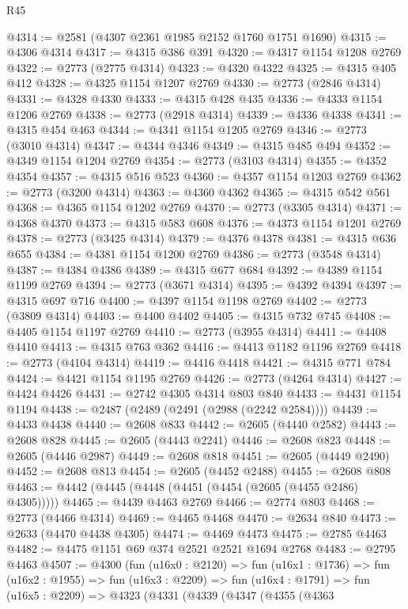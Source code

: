 \begin{lexlean}{R45}
\begin{coremodule}
@4314 := @2581 (@4307 @2361 @1985 @2152 @1760 @1751 @1690)
@4315 := @4306 @4314
@4317 := @4315 @386 @391
@4320 := @4317 @1154 @1208 @2769
@4322 := @2773 (@2775 @4314)
@4323 := @4320 @4322
@4325 := @4315 @405 @412
@4328 := @4325 @1154 @1207 @2769
@4330 := @2773 (@2846 @4314)
@4331 := @4328 @4330
@4333 := @4315 @428 @435
@4336 := @4333 @1154 @1206 @2769
@4338 := @2773 (@2918 @4314)
@4339 := @4336 @4338
@4341 := @4315 @454 @463
@4344 := @4341 @1154 @1205 @2769
@4346 := @2773 (@3010 @4314)
@4347 := @4344 @4346
@4349 := @4315 @485 @494
@4352 := @4349 @1154 @1204 @2769
@4354 := @2773 (@3103 @4314)
@4355 := @4352 @4354
@4357 := @4315 @516 @523
@4360 := @4357 @1154 @1203 @2769
@4362 := @2773 (@3200 @4314)
@4363 := @4360 @4362
@4365 := @4315 @542 @561
@4368 := @4365 @1154 @1202 @2769
@4370 := @2773 (@3305 @4314)
@4371 := @4368 @4370
@4373 := @4315 @583 @608
@4376 := @4373 @1154 @1201 @2769
@4378 := @2773 (@3425 @4314)
@4379 := @4376 @4378
@4381 := @4315 @636 @655
@4384 := @4381 @1154 @1200 @2769
@4386 := @2773 (@3548 @4314)
@4387 := @4384 @4386
@4389 := @4315 @677 @684
@4392 := @4389 @1154 @1199 @2769
@4394 := @2773 (@3671 @4314)
@4395 := @4392 @4394
@4397 := @4315 @697 @716
@4400 := @4397 @1154 @1198 @2769
@4402 := @2773 (@3809 @4314)
@4403 := @4400 @4402
@4405 := @4315 @732 @745
@4408 := @4405 @1154 @1197 @2769
@4410 := @2773 (@3955 @4314)
@4411 := @4408 @4410
@4413 := @4315 @763 @362
@4416 := @4413 @1182 @1196 @2769
@4418 := @2773 (@4104 @4314)
@4419 := @4416 @4418
@4421 := @4315 @771 @784
@4424 := @4421 @1154 @1195 @2769
@4426 := @2773 (@4264 @4314)
@4427 := @4424 @4426
@4431 := @2742 @4305 @4314 @803 @840
@4433 := @4431 @1154 @1194
@4438 := @2487 (@2489 (@2491 (@2988 (@2242 @2584))))
@4439 := @4433 @4438
@4440 := @2608 @833
@4442 := @2605 (@4440 @2582)
@4443 := @2608 @828
@4445 := @2605 (@4443 @2241)
@4446 := @2608 @823
@4448 := @2605 (@4446 @2987)
@4449 := @2608 @818
@4451 := @2605 (@4449 @2490)
@4452 := @2608 @813
@4454 := @2605 (@4452 @2488)
@4455 := @2608 @808
@4463 := @4442 (@4445 (@4448 (@4451 (@4454 (@2605 (@4455 @2486) @4305)))))
@4465 := @4439 @4463 @2769
@4466 := @2774 @803
@4468 := @2773 (@4466 @4314)
@4469 := @4465 @4468
@4470 := @2634 @840
@4473 := @2633 (@4470 @4438 @4305)
@4474 := @4469 @4473
@4475 := @2785 @4463
@4482 := @4475 @1151 @69 @374 @2521 @2521 @1694 @2768
@4483 := @2795 @4463
@4507 := @4300
    (fun (u16x0 : @2120) =>
    fun (u16x1 : @1736) =>
    fun (u16x2 : @1955) =>
    fun (u16x3 : @2209) =>
    fun (u16x4 : @1791) =>
    fun (u16x5 : @2209) =>
    @4323
      (@4331
        (@4339
          (@4347
            (@4355
              (@4363

\end{coremodule}
\end{lexlean}
